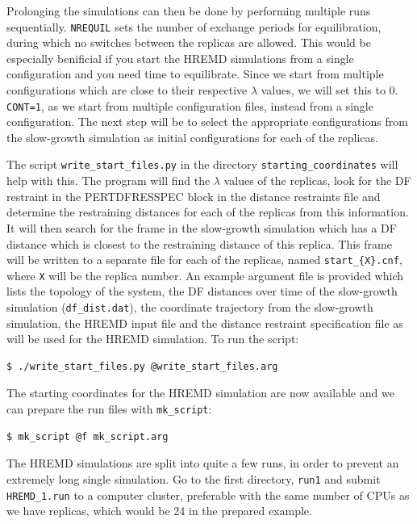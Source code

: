 Prolonging the simulations can then be done by performing multiple runs sequentially. 
\texttt{NREQUIL} sets the number of exchange periods for equilibration, during which no switches between the replicas are allowed. 
This would be especially benificial if you start the HREMD simulations from a single configuration and you need time to equilibrate. 
Since we start from multiple configurations which are close to their respective $\lambda$ values, we will set this to 0. 
\texttt{CONT=1}, as we start from multiple configuration files, instead from a single configuration.
The next step will be to select the appropriate configurations from the slow-growth simulation as initial configurations for each of the replicas.

The script \texttt{write\_start\_files.py} in the directory \texttt{starting\_coordinates} will help with this. 
The program will find the $\lambda$ values of the replicas, look for the DF restraint in the PERTDFRESSPEC block in the distance restraints file and determine the restraining distances for each of the replicas from this information.
It will then search for the frame in the slow-growth simulation which has a DF distance which is closest to the restraining distance of this replica.
This frame will be written to a separate file for each of the replicas, named \texttt{start\_\{X\}.cnf}, where \texttt{X} will be the replica number. 
An example argument file is provided which lists the topology of the system, the DF distances over time of the slow-growth simulation (\texttt{df\_dist.dat}), the coordinate trajectory from the slow-growth simulation, the HREMD input file and the distance restraint specification file as will be used for the HREMD simulation. To run the script:
\begin{lstlisting}
$ ./write_start_files.py @write_start_files.arg 
\end{lstlisting}
The starting coordinates for the HREMD simulation are now available and we can prepare the run files with \texttt{mk\_script}:
\begin{lstlisting}
$ mk_script @f mk_script.arg
\end{lstlisting}
The HREMD simulations are split into quite a few runs, in order to prevent an extremely long single simulation. 
Go to the first directory, \texttt{run1} and submit \texttt{HREMD\_1.run} to a computer cluster, preferable with the same number of CPUs as we have replicas, which would be 24 in the prepared example. 

